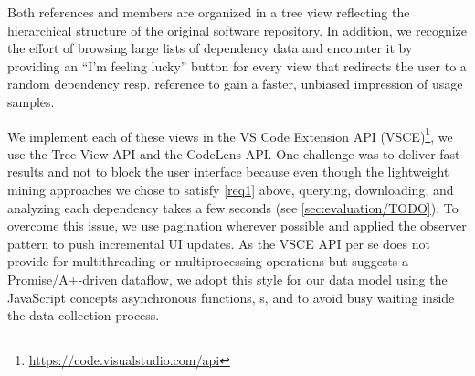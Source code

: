 Both references and members are organized in a tree view reflecting the hierarchical structure of the original software repository.
In addition, we recognize the effort of browsing large lists of dependency data and encounter it by providing an ``I'm feeling lucky'' button for every view that redirects the user to a random dependency resp. reference to gain a faster, unbiased impression of usage samples.

We implement each of these views in the VS Code Extension API (VSCE)\footnote{\url{https://code.visualstudio.com/api}}, we use the Tree View API and the CodeLens API.
One challenge was to deliver fast results and not to block the user interface because even though the lightweight mining approaches we chose to satisfy \cref{req1} above, querying, downloading, and analyzing each dependency takes a few seconds (see \cref{sec:evaluation/TODO}).
To overcome this issue, we use pagination wherever possible and applied the observer pattern to push incremental UI updates.
As the VSCE API per se does not provide for multithreading or multiprocessing operations but suggests a Promise/A+-driven dataflow, we adopt this style for our data model using the JavaScript concepts asynchronous functions, s, and  to avoid busy waiting inside the data collection process.
